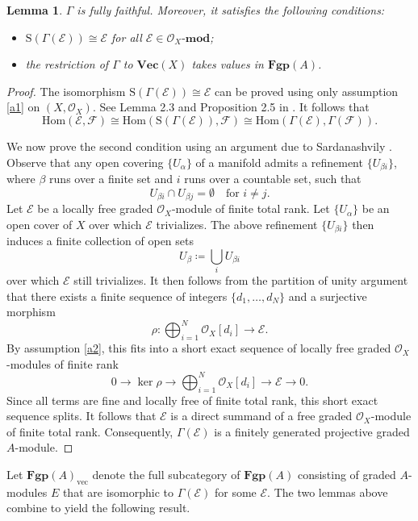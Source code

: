 \documentclass[12pt]{amsart}
\newtheorem{lem}[defn]{Lemma}
\numberwithin{equation}{section}
\theoremstyle{plain}
\newcommand{\sE}{\mathcal{E}}
\newcommand{\sF}{\mathcal{F}}
\newcommand{\sO}{\mathcal{O}}
\newcommand{\Hom}{\mathrm{Hom}}
\newcommand{\sh}{\mathrm{S}}
\begin{document}
	\begin{lem}\label{gff}
	    $\Gamma$ is fully faithful. Moreover, it satisfies the following conditions:
		\begin{itemize}
			\item $\sh(\Gamma(\sE)) \cong \sE$ for all $\sE \in \sO_X\text{-}\mathbf{mod}$;
			\item the restriction of $\Gamma$ to $\mathbf{Vec}(X)$	takes values in $\mathbf{Fgp}(A)$.
		\end{itemize}
	\end{lem}
	\begin{proof}
		The isomorphism $\sh(\Gamma(\sE)) \cong \sE$ can be proved using only assumption \ref{a1} on $(X,\sO_X)$. See Lemma 2.3 and Proposition 2.5 in \cite{morye2013note}. It follows that
		\[
		\Hom(\sE, \sF) \cong \Hom(\sh(\Gamma(\sE)), \sF) \cong \Hom(\Gamma(\sE), \Gamma(\sF)).
		\]
		
		We now prove the second condition using an argument due to Sardanashvily \cite{sardanashvily2001remark}. Observe that any open covering $\{U_\alpha\}$ of a manifold admits a refinement $\{U_{\beta i}\}$, where $\beta$ runs over a finite set and $i$ runs over a countable set, such that
		\[
		U_{\beta i} \cap U_{\beta j} = \emptyset \quad \text{for } i \neq j.
		\]
		Let $\sE$ be a locally free graded $\sO_X$-module of finite total rank. Let $\{U_\alpha\}$ be an open cover of $X$ over which $\sE$ trivializes. The above refinement $\{U_{\beta i}\}$ then induces a finite collection of open sets
		\[
		U_\beta \coloneqq \bigcup_i U_{\beta i}
		\]
		over which $\sE$ still trivializes.	It then follows from the partition of unity argument that there exists a finite sequence of integers $\{d_1, \dots,d_N\}$  and a surjective morphism
		\[
		\rho\colon \bigoplus_{i=1}^N\sO_X[d_i] \longrightarrow \sE.
		\]
		By assumption \ref{a2}, this fits into a short exact sequence of locally free graded $\sO_X$-modules of finite rank
		\[
		0 \longrightarrow \ker \rho \longrightarrow \bigoplus_{i=1}^N\sO_X[d_i]  \longrightarrow \sE \longrightarrow 0.
		\]
		Since all terms are fine and locally free of finite total rank, this short exact sequence splits. It follows that $\sE$ is a direct summand of a free graded $\sO_X$-module of finite total rank. Consequently, $\Gamma(\sE)$ is a finitely generated projective graded $A$-module.
 	\end{proof}
	
	Let $\mathbf{Fgp}(A)_{\mathrm{vec}}$ denote the full subcategory of $ \mathbf{Fgp}(A)$ consisting of graded $A$-modules $E$ that are isomorphic to $\Gamma(\sE)$ for some $\sE$. The two lemmas above combine to yield the following result.
	
\end{document}
